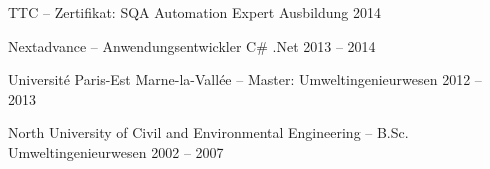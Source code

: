 
\begin{cventries}

  \cventry
    {}
    {TTC -- Zertifikat: SQA Automation Expert Ausbildung}
    {}
    {2014}
    {}

  \cventry
    {}
    {Nextadvance -- Anwendungsentwickler C\# .Net}
    {}
    {2013 -- 2014}
    {}

  \cventry
    {}
    {Université Paris-Est Marne-la-Vallée -- Master: Umweltingenieurwesen}
    {}
    {2012 -- 2013}
    {}

  \cventry
    {}
    {North University of Civil and Environmental Engineering -- B.Sc. Umweltingenieurwesen}
    {}
    {2002 -- 2007}
    {}

\end{cventries}
